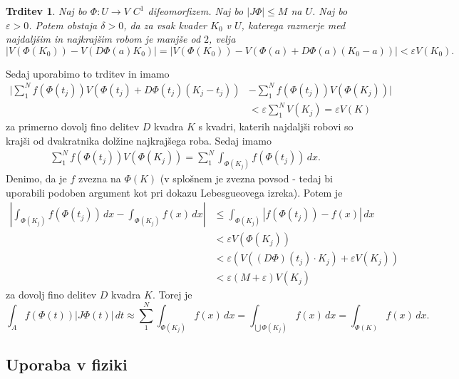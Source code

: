 \documentclass[10pt, a4paper]{article}
\newtheorem{trditev}[izr]{Trditev}
\begin{document}
\begin{trditev}
    Naj bo $\Phi: U \to V$ $C^1$ difeomorfizem. Naj bo $|J \Phi| \leq M$ na $U$.
    Naj bo $\varepsilon > 0$. Potem obstaja $\delta > 0$, da za vsak kvader $K_0$ v $U$,
    katerega razmerje med najdaljšim in najkrajšim robom je manjše od $2$, velja
    $$|V(\Phi (K_0)) - V(D \Phi(a) K_0)| = |V(\Phi (K_0)) - V(\Phi (a) + D \Phi (a) (K_0 - a))| < \varepsilon V(K_0).$$
\end{trditev}

Sedaj uporabimo to trditev in imamo 
\begin{align*}
    \Big| \sum_1 ^N f(\Phi(t_j)) V(\Phi (t_j) + D \Phi (t_j)(K_j - t_j)) &- \sum_1 ^N f(\Phi(t_j)) V(\Phi (K_j)) \Big|\\
    &< \varepsilon \sum_1 ^N V(K_j) = \varepsilon V(K)
\end{align*}
za primerno dovolj fino delitev $D$ kvadra $K$ s kvadri, katerih najdaljši robovi so krajši od 
dvakratnika dolžine najkrajšega roba. Sedaj imamo
\begin{align*}
    \sum_1 ^N f(\Phi(t_j)) V(\Phi (K_j)) = \sum_1 ^N \int_{\Phi(K_j)} f(\Phi (t_j))\, dx.
\end{align*}
Denimo, da je $f$ zvezna na $\Phi(K)$
(v splošnem je zvezna povsod - tedaj bi uporabili podoben argument kot pri dokazu Lebesgueovega izreka).
Potem je 
\begin{align*}
    \left| \int_{\Phi (K_j)} f(\Phi (t_j))\, dx - \int_{\Phi(K_j)} f(x)\, dx \right| &\leq \int_{\Phi(K_j)} |f(\Phi (t_j)) - f(x)|\, dx\\
    &< \varepsilon V(\Phi (K_j))\\
    &< \varepsilon (V((D \Phi) (t_j) \cdot K_j) + \varepsilon V(K_j))\\
    &< \varepsilon (M + \varepsilon) V(K_j)
\end{align*}
za dovolj fino delitev $D$ kvadra $K$. Torej je 
$$\int_A f(\Phi(t)) |J \Phi (t)|\, dt \approx \sum_1 ^N \int_{\Phi(K_j)} f(x)\, dx = \int_{\bigcup \Phi (K_j)} f(x)\, dx = \int_{\Phi (K)} f(x)\, dx.$$
\subsection{Uporaba v fiziki}
\end{document}
